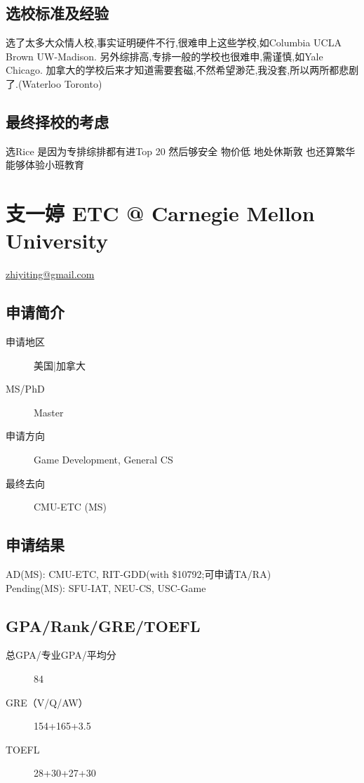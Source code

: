 \documentclass[11pt,fleqn,openany]{book} %
\begin{document}
\subsection*{选校标准及经验}
选了太多大众情人校,事实证明硬件不行,很难申上这些学校,如Columbia UCLA Brown UW-Madison.
另外综排高,专排一般的学校也很难申,需谨慎,如Yale Chicago.
加拿大的学校后来才知道需要套磁,不然希望渺茫,我没套,所以两所都悲剧了.(Waterloo Toronto)
\subsection*{最终择校的考虑}
选Rice 是因为专排综排都有进Top 20
然后够安全 物价低 地处休斯敦 也还算繁华
能够体验小班教育
\clearpage
\section{支一婷 ETC @ Carnegie Mellon University}
\hfill \href{mailto:zhiyiting@gmail.com}{zhiyiting@gmail.com}

\noindent\begin{minipage}[t]{0.45\textwidth}
\subsection*{申请简介}
\begin{description}
\item[申请地区] 美国|加拿大
\item[MS/PhD] Master
\item[申请方向] Game Development, General CS
\item[最终去向] CMU-ETC (MS)
\end{description}
\end{minipage}
\hfill
\begin{minipage}[t]{0.45\textwidth}
\subsection*{申请结果}
\noindent AD(MS): CMU-ETC, RIT-GDD(with \$10792;可申请TA/RA)\\
Pending(MS): SFU-IAT, NEU-CS, USC-Game
\end{minipage}
\subsection*{GPA/Rank/GRE/TOEFL}
\begin{description}
\item[总GPA/专业GPA/平均分] 84
\item[GRE（V/Q/AW）] 154+165+3.5
\item[TOEFL] 28+30+27+30
\end{description}
\end{document}
